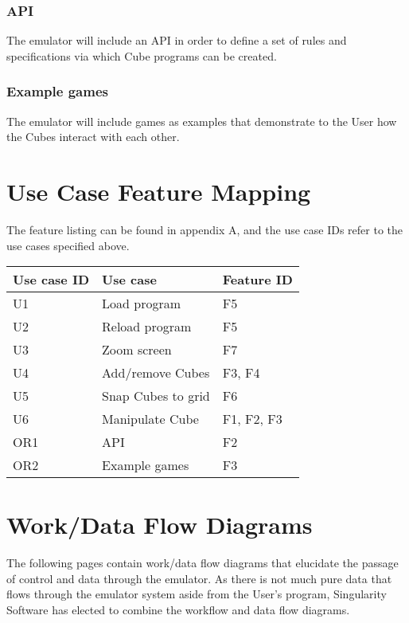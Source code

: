 \documentclass[12pt]{article}
\begin{document}
	\subsubsection{API}
		The emulator will include an API in order to define a set of rules and specifications via which Cube programs can be created.
	
	\subsubsection{Example games}
		The emulator will include games as examples that demonstrate to the User how the Cubes interact with each other.

\newpage
\section{Use Case Feature Mapping}
    The feature listing can be found in appendix A, and the use case IDs refer to the use cases specified above.
    \begin{table}[h]
      \begin{tabular}{l | l | l}
        \textbf{Use case ID} &
        \textbf{Use case} &
        \textbf{Feature ID} \\ \hline

        U1 &
        Load program &
        F5 \\

        U2 &
        Reload program &
        F5 \\

        U3 &
        Zoom screen &
        F7 \\

        U4 &
        Add/remove Cubes &
        F3, F4\\

        U5 &
        Snap Cubes to grid &
        F6 \\

        U6 &
        Manipulate Cube &
        F1, F2, F3 \\
		
	OR1 & 
	API &
	F2 \\
		
	OR2 &
	Example games &
	F3 \\

      \end{tabular}
    \end{table}

\section{Work/Data Flow Diagrams}
The following pages contain work/data flow diagrams that elucidate the passage of control and data through the emulator. As there is not much pure data that flows through the emulator system aside from the User's program, Singularity Software has elected to combine the workflow and data flow diagrams.
\end{document}
